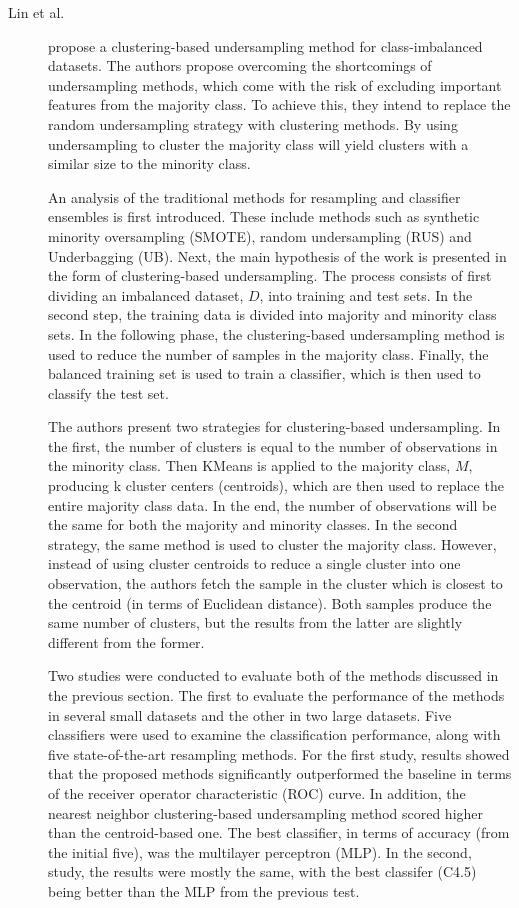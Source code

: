 \begin{description}
    \item[Lin et al.]\cite{Lin.Tsai.ea_Clusteringbasedundersamplingclassimbalanced_2017}  propose a clustering-based undersampling method for class-imbalanced datasets. The authors propose overcoming the shortcomings of undersampling methods, which come with the risk of excluding important features from the majority class. To achieve this, they intend to replace the random undersampling strategy with clustering methods. By using undersampling to cluster the majority class will yield clusters with a similar size to the minority class. 
    
    An analysis of the traditional methods for resampling and classifier ensembles is first introduced. These include methods such as synthetic minority oversampling (SMOTE), random undersampling (RUS) and Underbagging (UB). Next, the main hypothesis of the work is presented in the form of clustering-based undersampling. The process consists of first dividing an imbalanced dataset, $D$, into training and test sets. In the second step, the training data is divided into majority and minority class sets. In the following phase, the clustering-based undersampling method is used to reduce the number of samples in the majority class. Finally, the balanced training set is used to train a classifier, which is then used to classify the test set. 

    The authors present two strategies for clustering-based undersampling. In the first, the number of clusters is equal to the number of observations in the minority class. Then KMeans is applied to the majority class, $M$, producing k cluster centers (centroids), which are then used to replace the entire majority class data. In the end, the number of observations will be the same for both the majority and minority classes. In the second strategy, the same method is used to cluster the majority class. However, instead of using cluster centroids to reduce a single cluster into one observation, the authors fetch the sample in the cluster which is closest to the centroid (in terms of Euclidean distance). Both samples produce the same number of clusters, but the results from the latter are slightly different from the former.

    Two studies were conducted to evaluate both of the methods discussed in the previous section. The first to evaluate the performance of the methods in several small datasets and the other in two large datasets. Five classifiers were used to examine the classification performance, along with five state-of-the-art resampling methods. For the first study, results showed that the proposed methods significantly outperformed the baseline in terms of the receiver operator characteristic (ROC) curve. In addition, the nearest neighbor clustering-based undersampling method scored higher than the centroid-based one. The best classifier, in terms of accuracy (from the initial five), was the multilayer perceptron (MLP). In the second, study, the results were mostly the same, with the best classifer (C4.5) being better than the MLP from the previous test.


\end{description}
